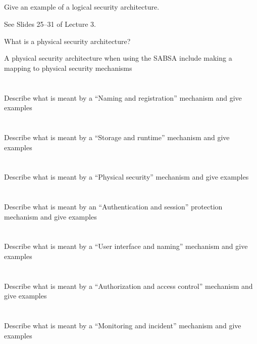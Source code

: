\begin{questions}
\begin{parts}
  \part{} Give an example of a logical security architecture.
    \begin{solution}
      See Slides 25--31 of Lecture 3.
    \end{solution}
  \end{parts}

\item What is a physical security architecture?
\item A physical security architecture when using the SABSA include making a mapping to physical security mechanisms
  \begin{parts}
  \part{} Describe what is meant by a ``Naming and registration'' mechanism and give examples
  \part{} Describe what is meant by a ``Storage and runtime'' mechanism and give examples
  \part{} Describe what is meant by a ``Physical security'' mechanism and give examples
  \part{} Describe what is meant by an ``Authentication and session'' protection mechanism and give examples
  \part{} Describe what is meant by a ``User interface and naming'' mechanism and give examples
  \part{} Describe what is meant by a ``Authorization and access control'' mechanism and give examples
  \part{} Describe what is meant by a ``Monitoring and incident'' mechanism and give examples
  \end{parts}


\end{questions}
